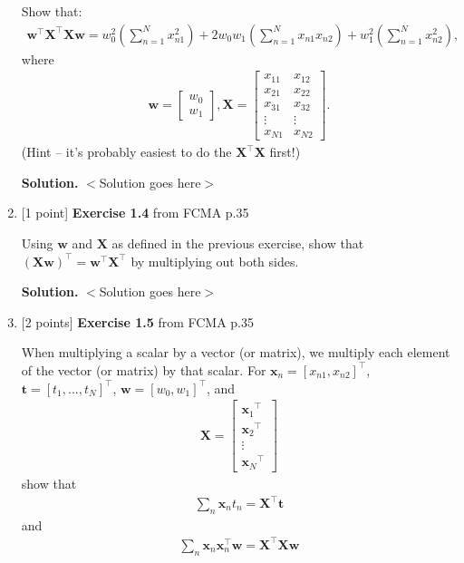 \documentclass[10pt]{article}
\begin{document}
\begin{enumerate}
Show that:
\begin{eqnarray*}
\mathbf{w}^\top\mathbf{X}^\top\mathbf{X}\mathbf{w} = w_0^2 \left( \sum_{n=1}^N x_{n1}^2 \right) + 2w_0w_1 \left( \sum_{n=1}^N x_{n1}x_{n2} \right) + w_1^2 \left( \sum_{n=1}^N x_{n2}^2 \right),
\end{eqnarray*}
where
\begin{eqnarray*}
\mathbf{w} = 
    \begin{bmatrix}
    w_0 \\[0.3em]
    w_1
    \end{bmatrix}
    ,
\mathbf{X} = 
    \begin{bmatrix}
    x_{11} & x_{12} \\[0.3em]
    x_{21} & x_{22} \\[0.3em]
    x_{31} & x_{32} \\[0.3em]
    \vdots & \vdots \\[0.3em]
    x_{N1} & x_{N2}
    \end{bmatrix}
    .
\end{eqnarray*}
(Hint -- it's probably easiest to do the $\mathbf{X}^\top\mathbf{X}$ first!)

{\bf Solution.} $<$Solution goes here$>$\\


\item \label{prob:4} [1 point]
{\bf Exercise 1.4} from FCMA p.35

Using $\mathbf{w}$ and $\mathbf{X}$ as defined in the previous exercise, show that ${(\mathbf{X}\mathbf{w})}^\top = {\mathbf{w}}^\top{\mathbf{X}}^\top$ by multiplying out both sides.

{\bf Solution.} $<$Solution goes here$>$\\



\item \label{prob:5} [2 points]
{\bf Exercise 1.5} from FCMA p.35  %

When multiplying a scalar by a vector (or matrix), we multiply each element of the vector (or matrix) by that scalar.  For $\mathbf{x}_n = {[ x_{n1}, x_{n2} ]}^\top$, $\mathbf{t} = {[ t_1,...,t_N ]}^\top$, $\mathbf{w} = {[ w_0, w_1 ]}^\top$, and
\begin{eqnarray*}
\mathbf{X} = 
    \begin{bmatrix}
    {\mathbf{x}_{1}}^\top \\[0.3em]
    {\mathbf{x}_{2}}^\top \\[0.3em]
    \vdots \\[0.3em]
    {\mathbf{x}_{N}}^\top
    \end{bmatrix}
\end{eqnarray*}
show that
\begin{eqnarray*}
\sum_{n} \mathbf{x}_n t_n = \mathbf{X}^\top\mathbf{t}
\end{eqnarray*}
and
\begin{eqnarray*}
\sum_{n} \mathbf{x}_n \mathbf{x}_n ^\top \mathbf{w} = \mathbf{X}^\top\mathbf{X} \mathbf{w}
\end{eqnarray*}


\end{enumerate}
\end{document}
